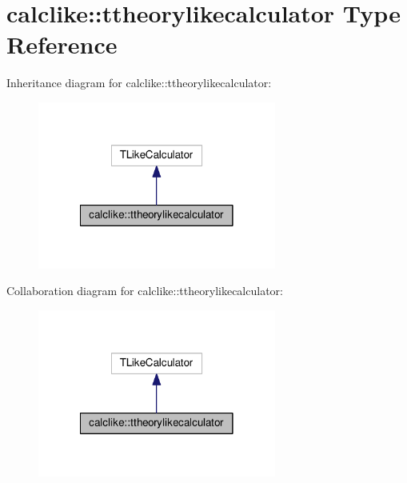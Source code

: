 \hypertarget{structcalclike_1_1ttheorylikecalculator}{}\section{calclike\+:\+:ttheorylikecalculator Type Reference}
\label{structcalclike_1_1ttheorylikecalculator}


Inheritance diagram for calclike\+:\+:ttheorylikecalculator\+:
\nopagebreak
\begin{figure}[H]
\begin{center}
\leavevmode
\includegraphics[width=222pt]{structcalclike_1_1ttheorylikecalculator__inherit__graph}
\end{center}
\end{figure}


Collaboration diagram for calclike\+:\+:ttheorylikecalculator\+:
\nopagebreak
\begin{figure}[H]
\begin{center}
\leavevmode
\includegraphics[width=222pt]{structcalclike_1_1ttheorylikecalculator__coll__graph}
\end{center}
\end{figure}
